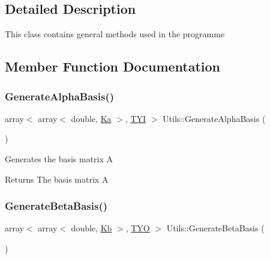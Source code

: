 \subsection{Detailed Description}
This class contains general methods used in the programme 

\subsection{Member Function Documentation}
\mbox{\label{class_utils_ad04b260c837c763c9b8beb3d529a0be5}} 
\subsubsection{\texorpdfstring{Generate\+Alpha\+Basis()}{GenerateAlphaBasis()}}
{\footnotesize\ttfamily array$<$ array$<$ double, \mbox{\hyperlink{_constants_8h_a63d387da07d2165955fa3ed13918bb31}{Ka}} $>$, \mbox{\hyperlink{_constants_8h_a45bcfb91788c7d66f5de11604fb1eb6e}{T\+YI}} $>$ Utils\+::\+Generate\+Alpha\+Basis (\begin{DoxyParamCaption}{ }\end{DoxyParamCaption})\hspace{0.3cm}{\ttfamily [static]}}

Generates the basis matrix A \begin{DoxyReturn}{Returns}
The basis matrix A 
\end{DoxyReturn}
\mbox{\label{class_utils_a2daba4f860aab2cdc2573c429cd68f07}} 
\subsubsection{\texorpdfstring{Generate\+Beta\+Basis()}{GenerateBetaBasis()}}
{\footnotesize\ttfamily array$<$ array$<$ double, \mbox{\hyperlink{_constants_8h_ad3e444d768e5365a1620b7b5702c4eb8}{Kb}} $>$, \mbox{\hyperlink{_constants_8h_ade2b686fe2ed5231b32fced73d812981}{T\+YO}} $>$ Utils\+::\+Generate\+Beta\+Basis (\begin{DoxyParamCaption}{ }\end{DoxyParamCaption})\hspace{0.3cm}{\ttfamily [static]}}

